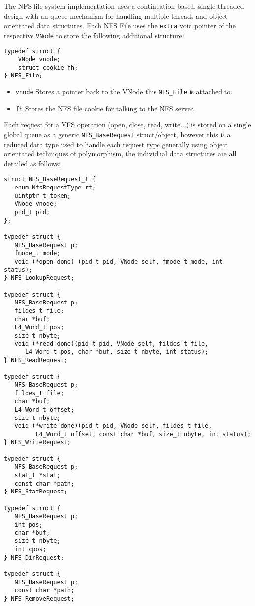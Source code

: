 \documentclass[12pt,english]{article}
\begin{document}
The NFS file system implementation uses a continuation based, single threaded design with an queue mechanism for handling multiple threads and object orientated data structures. Each NFS File uses the \texttt{extra} void pointer of the respective \texttt{VNode} to store the following additional structure:

\begin{verbatim}
typedef struct {
    VNode vnode;
    struct cookie fh;
} NFS_File;
\end{verbatim}

\begin{itemize}
\item \texttt{vnode} Stores a pointer back to the VNode this \texttt{NFS\_File} is attached to.
\item \texttt{fh} Stores the NFS file cookie for talking to the NFS server.
\end{itemize}

Each request for a VFS operation (open, close, read, write...) is stored on a single global queue as a generic \texttt{NFS\_BaseRequest} struct/object, however this is a reduced data type used to handle each request type generally using object orientated techniques of polymorphism, the individual data structures are all detailed as follows:

\begin{verbatim}
struct NFS_BaseRequest_t {
   enum NfsRequestType rt;
   uintptr_t token;
   VNode vnode;
   pid_t pid;
};

typedef struct {
   NFS_BaseRequest p;
   fmode_t mode;
   void (*open_done) (pid_t pid, VNode self, fmode_t mode, int status);
} NFS_LookupRequest;

typedef struct {
   NFS_BaseRequest p;
   fildes_t file;
   char *buf;
   L4_Word_t pos;
   size_t nbyte;
   void (*read_done)(pid_t pid, VNode self, fildes_t file,
      L4_Word_t pos, char *buf, size_t nbyte, int status);
} NFS_ReadRequest;

typedef struct {
   NFS_BaseRequest p;
   fildes_t file;
   char *buf;
   L4_Word_t offset;
   size_t nbyte;
   void (*write_done)(pid_t pid, VNode self, fildes_t file,
         L4_Word_t offset, const char *buf, size_t nbyte, int status);
} NFS_WriteRequest;

typedef struct {
   NFS_BaseRequest p;
   stat_t *stat;
   const char *path;
} NFS_StatRequest;

typedef struct {
   NFS_BaseRequest p;
   int pos;
   char *buf;
   size_t nbyte;
   int cpos;
} NFS_DirRequest;

typedef struct {
   NFS_BaseRequest p;
   const char *path;
} NFS_RemoveRequest;
\end{verbatim}
\end{document}
